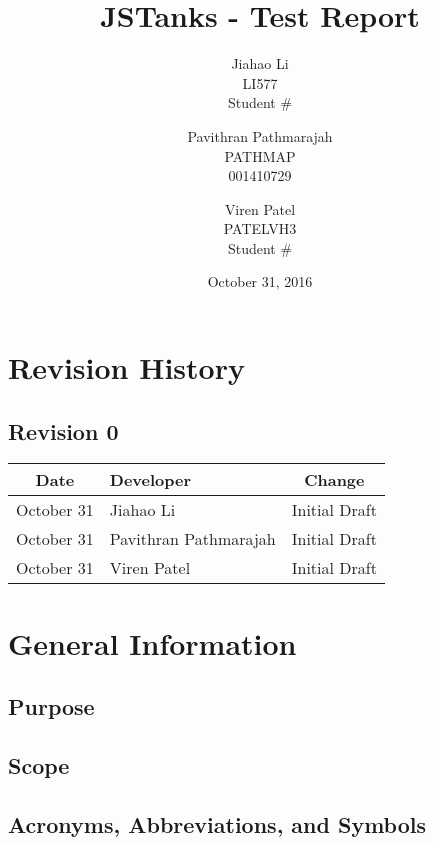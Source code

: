\documentclass{article}
\begin{document}
\newpage
\title{JSTanks - Test Report}
\date{October 31, 2016}
\author{Jiahao Li\\LI577\\Student \# \and Pavithran Pathmarajah\\PATHMAP\\001410729 \and Viren Patel\\PATELVH3\\Student \#}

\maketitle

\newpage
{}
\tableofcontents
\newpage
\section{Revision History}
\subsection{Revision 0}
\begin{table}[h]
	\begin{tabular}{clc}
		\toprule
		Date & Developer & Change\\
		\midrule
		October 31&Jiahao Li &Initial Draft \\
		October 31&Pavithran Pathmarajah &Initial Draft\\
		October 31&Viren Patel  &Initial Draft\\
	\end{tabular}
\end{table}


\section{General Information}
\subsection{Purpose}
\subsection{Scope}
\subsection{Acronyms, Abbreviations, and Symbols}
\end{document}
